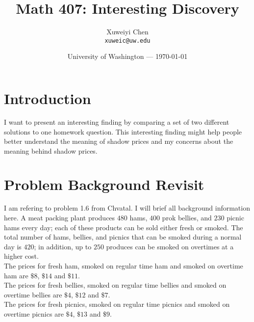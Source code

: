 \documentclass{article}
\title{Math 407: Interesting Discovery} %
\author{Xuweiyi Chen\\ \texttt{xuweic@uw.edu}} %
\date{University of Washington --- \today} %
\begin{document}
\maketitle %


\section*{Introduction} %

I want to present an interesting finding by comparing a set of two different solutions
to one homework question. This interesting finding might help people better understand 
the meaning of shadow prices and my concerns about the meaning behind shadow prices.



\section{Problem Background Revisit} %

I am refering to problem 1.6 from Chvatal. I will brief all background information 
here. A meat packing plant produces $480$ hams, $400$ prok bellies, and $230$ picnic 
hams every day; each of these products can be sold either fresh or smoked. The total 
number of hams, bellies, and picnics that can be smoked during a normal day is $420$; 
in addition, up to $250$ produces can be smoked on overtimes at a higher cost. \\
The prices for fresh ham, smoked on regular time ham and smoked on overtime ham are 
$\$8$, $\$14$ and $\$11$. \\
The prices for fresh bellies, smoked on regular time bellies and smoked on overtime bellies are 
$\$4$, $\$12$ and $\$7$. \\
The prices for fresh picnics, smoked on regular time picnics and smoked on overtime picnics are 
$\$4$, $\$13$ and $\$9$.
\end{document}
